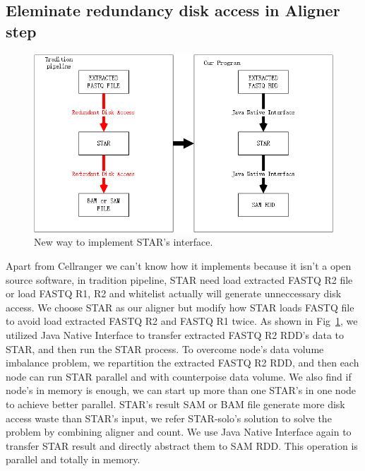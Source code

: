 \documentclass[runningheads]{llncs}
\begin{document}
\subsection{Eleminate redundancy disk access in Aligner step}
\begin{figure}
  \includegraphics[width=\textwidth]{fig2.png}
  \caption{New way to implement STAR's interface.} \label{fig2}
\end{figure}
Apart from Cellranger we can't know how it implements because it isn't a open source software, in tradition pipeline, STAR need load extracted FASTQ R2 file or load FASTQ R1, R2 and whitelist actually will generate unneccessary disk access.  
We choose STAR as our aligner but modify how STAR loads FASTQ file to avoid load extracted FASTQ R2 and FASTQ R1 twice. 
As shown in Fig~\ref{fig2}, we utilized Java Native Interface to transfer extracted FASTQ R2 RDD's data to STAR, and then run the STAR process.
To overcome node's data volume imbalance problem, we repartition the extracted FASTQ R2 RDD, and then each node can run STAR parallel and with counterpoise data volume.
We also find if node's in memory is enough, we can start up more than one STAR's in one node to achieve better parallel.
STAR's result SAM or BAM file generate more disk access waste than STAR's input, we refer STAR-solo's solution to solve the problem by combining aligner and count.
We use Java Native Interface again to transfer STAR result and directly abstract them to SAM RDD.
This operation is parallel and totally in memory.
\end{document}
